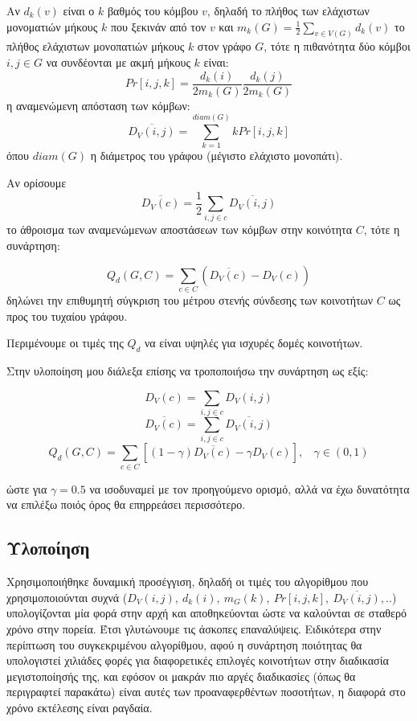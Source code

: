 \documentclass[12pt, letterpaper]{article}
\begin{document}
Αν $d_k(v)$ είναι ο $k$ βαθμός του κόμβου $v$, δηλαδή το πλήθος των 
ελάχιστων μονοματιών μήκους $k$ που ξεκινάν από τον $v$ και 
$m_k(G) = \frac{1}{2} \sum_{v \in V (G)} d_k(v)$ το πλήθος 
ελάχιστων μονοπατιών μήκους $k$ στον γράφο $G$, τότε η πιθανότητα δύο κόμβοι
$i,j \in G$ να συνδέονται με ακμή μήκους $k$ είναι:
\[ Pr[i,j,k] = \frac{d_k(i)}{2m_k(G)} \frac{d_k(j)}{2m_k(G)} \]
η αναμενώμενη απόσταση των κόμβων:
\[ \overline{D_V(i,j)} = \sum_{k=1}^{diam(G)} k Pr[i,j,k] \]
όπου $diam(G)$ η διάμετρος του γράφου (μέγιστο ελάχιστο μονοπάτι).

Αν ορίσουμε
\[ \overline{ D_V(c)  } = \frac{1}{2} \sum_{i,j \in c} \overline{ D_V(i,j) }\]
το άθροισμα των αναμενώμενων αποστάσεων των κόμβων στην κοινότητα $C$, 
τότε η συνάρτηση:

\[ Q_d(G,C) = \sum_{c \in C} (\overline{ D_V(c) } - D_V(c))\]
δηλώνει την επιθυμητή σύγκριση του μέτρου στενής σύνδεσης των κοινοτήτων 
$C$ ως προς του τυχαίου γράφου. 

Περιμένουμε οι τιμές της $Q_d$ να είναι υψηλές για ισχυρές δομές κοινοτήτων.


Στην υλοποίηση μου διάλεξα επίσης να τροποποιήσω την συνάρτηση ως εξίς:

\[ D_V(c) = \sum_{i,j \in c} D_V(i,j) \]
\[ \overline{ D_V(c)  } =  \sum_{i,j \in c} \overline{ D_V(i,j) }\]
\[ Q_d(G,C) = \sum_{c \in C} [(1 - \gamma)\overline{ D_V(c) } - \gamma D_V(c) ],  \ \ \ \ \gamma \in (0,1)\]

ώστε για $\gamma = 0.5$ να ισοδυναμεί με τον προηγούμενο ορισμό, αλλά να έχω 
δυνατότητα να επιλέξω ποιός όρος θα επηρρεάσει περισσότερο.



\subsection{Υλοποίηση}  \label{ylop}


Χρησιμοποιήθηκε δυναμική προσέγγιση, δηλαδή οι τιμές του αλγορίθμου που χρησιμοποιούνται 
συχνά ($D_V(i,j), \ d_k(i), \ m_G(k), \ Pr[i,j,k],  \ \overline{D_V(i,j)},..$)
υπολογίζονται μία φορά στην αρχή και αποθηκεύονται ώστε να καλούνται σε σταθερό χρόνο στην πορεία. Έτσι γλυτώνουμε τις 
άσκοπες επαναλύψεις. Ειδικότερα στην περίπτωση του συγκεκριμένου αλγορίθμου, αφού 
η συνάρτηση ποιότητας θα υπολογιστεί χιλιάδες φορές για διαφορετικές 
επιλογές κοινοτήτων στην διαδικασία μεγιστοποίησής της, και εφόσον οι μακράν 
πιο αργές διαδικασίες (όπως θα περιγραφτεί παρακάτω) είναι αυτές των 
προαναφερθέντων ποσοτήτων, η διαφορά στο χρόνο εκτέλεσης είναι ραγδαία. 
\end{document}
